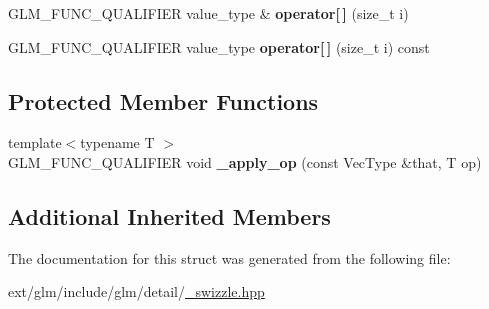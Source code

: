\begin{DoxyCompactItemize}
\item 
\hypertarget{structglm_1_1detail_1_1__swizzle__base2_aa3f2ab8e3e1a5c414b3fdca4cf75b706}{G\-L\-M\-\_\-\-F\-U\-N\-C\-\_\-\-Q\-U\-A\-L\-I\-F\-I\-E\-R value\-\_\-type \& {\bfseries operator\mbox{[}$\,$\mbox{]}} (size\-\_\-t i)}\label{structglm_1_1detail_1_1__swizzle__base2_aa3f2ab8e3e1a5c414b3fdca4cf75b706}

\item 
\hypertarget{structglm_1_1detail_1_1__swizzle__base2_a1bec6727adac01b6bc3e1ccba935167e}{G\-L\-M\-\_\-\-F\-U\-N\-C\-\_\-\-Q\-U\-A\-L\-I\-F\-I\-E\-R value\-\_\-type {\bfseries operator\mbox{[}$\,$\mbox{]}} (size\-\_\-t i) const }\label{structglm_1_1detail_1_1__swizzle__base2_a1bec6727adac01b6bc3e1ccba935167e}

\end{DoxyCompactItemize}
\subsection*{Protected Member Functions}
\begin{DoxyCompactItemize}
\item 
\hypertarget{structglm_1_1detail_1_1__swizzle__base2_a11d049274a60ecf4aac8cebc4c4e9be5}{{\footnotesize template$<$typename T $>$ }\\G\-L\-M\-\_\-\-F\-U\-N\-C\-\_\-\-Q\-U\-A\-L\-I\-F\-I\-E\-R void {\bfseries \-\_\-apply\-\_\-op} (const Vec\-Type \&that, T op)}\label{structglm_1_1detail_1_1__swizzle__base2_a11d049274a60ecf4aac8cebc4c4e9be5}

\end{DoxyCompactItemize}
\subsection*{Additional Inherited Members}


The documentation for this struct was generated from the following file\-:\begin{DoxyCompactItemize}
\item 
ext/glm/include/glm/detail/\hyperlink{__swizzle_8hpp}{\-\_\-swizzle.\-hpp}\end{DoxyCompactItemize}
